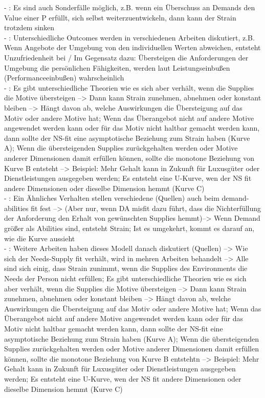 - \cite[S. 9]{edwards:1996}: Es sind auch Sonderfälle möglich, z.B. wenn ein Überschuss an Demands den Value einer P erfüllt, sich selbst weiterzuentwickeln, dann kann der Strain trotzdem sinken \\
- \cite[S. 4]{edwards:1990}: Unterschiedliche Outcomes werden in verschiedenen Arbeiten diskutiert, z.B. Wenn Angebote der Umgebung von den individuellen Werten abweichen, entsteht Unzufriedenheit bei \textcite{locke:1969} / Im Gegensatz dazu: Übersteigen die Anforderungen der Umgebung die persönlichen Fähigkeiten, werden laut \textcite{theoryOfBehaviorInOrganizations:1980} Leistungseinbußen (Performanceeinbußen) wahrscheinlich \\
- \cite[S. 21]{edwards:2008}: Es gibt unterschiedliche Theorien wie es sich aber verhält, wenn die Supplies die Motive übersteigen --> Dann kann Strain zunehmen, abnehmen oder konstant bleiben --> Hängt davon ab, welche Auswirkungen die Übersteigung auf das Motiv oder andere Motive hat; Wenn das Überangebot nicht auf andere Motive angewendet werden kann oder für das Motiv nicht haltbar gemacht werden kann, dann sollte der NS-fit eine asymptotische Beziehung zum Strain haben (Kurve A); Wenn die übersteigenden Supplies zurückgehalten werden oder Motive anderer Dimensionen damit erfüllen können, sollte die monotone Beziehung von Kurve B entsteht --> Beispiel: Mehr Gehalt kann in Zukunft für Luxusgüter oder Dienstleistungen ausgegeben werden; Es entsteht eine U-Kurve, wen der NS fit andere Dimensionen oder dieselbe Dimension hemmt (Kurve C) \\
- \cite[S. 22f.]{edwards:2008}: Ein Ähnliches Verhalten stellen verschiedene (Quellen) auch beim demand-abilities fit fest --> (Aber nur, wenn DA misfit dazu führt, dass die Nichterfüllung der Anforderung den Erhalt von gewünschten Supplies hemmt)--> Wenn Demand größer als Abilities sind, entsteht Strain; Ist es umgekehrt, kommt es darauf an, wie die Kurve aussieht \\
- \cite[S. 21]{edwards:2008}: Weitere Arbeiten haben dieses Modell danach diskutiert (Quellen) --> Wie sich der Needs-Supply fit verhält, wird in mehren Arbeiten behandelt --> Alle sind sich einig, dass Strain zunimmt, wenn die Supplies des Environments die Needs der Person nicht erfüllen; Es gibt unterschiedliche Theorien wie es sich aber verhält, wenn die Supplies die Motive übersteigen --> Dann kann Strain zunehmen, abnehmen oder konstant bleiben --> Hängt davon ab, welche Auswirkungen die Übersteigung auf das Motiv oder andere Motive hat; Wenn das Überangebot nicht auf andere Motive angewendet werden kann oder für das Motiv nicht haltbar gemacht werden kann, dann sollte der NS-fit eine asymptotische Beziehung zum Strain haben (Kurve A); Wenn die übersteigenden Supplies zurückgehalten werden oder Motive anderer Dimensionen damit erfüllen können, sollte die monotone Beziehung von Kurve B entstehtn --> Beispiel: Mehr Gehalt kann in Zukunft für Luxusgüter oder Dienstleistungen ausgegeben werden; Es entsteht eine U-Kurve, wen der NS fit andere Dimensionen oder dieselbe Dimension hemmt (Kurve C) \\
